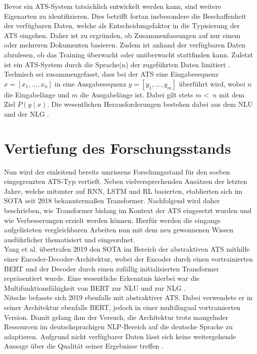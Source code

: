 \noindent
Bevor ein \ac{ATS}-System tatsächlich entwickelt werden kann, sind weitere Eigenarten zu identifizieren. Dies betrifft fortan insbesondere die Beschaffenheit der verfügbaren Daten, welche als Entscheidungsfaktor in die Typisierung der \ac{ATS} eingehen. Daher ist zu ergründen, ob Zusammenfassungen auf nur einem oder mehreren Dokumenten basieren. Zudem ist anhand der verfügbaren Daten abzulesen, ob das Training überwacht oder unüberwacht stattfinden kann. Zuletzt ist ein \ac{ATS}-System durch die Sprache(n) der zugeführten Daten limitiert \cite[S.~5]{GAM16}.\\

\noindent
Technisch sei zusammengefasst, dass bei der \ac{ATS} eine Eingabesequenz $x = [x_{1}, ..., x_{n}]$ in eine Ausgabesequenz $y = [y_{1}, ..., y_{m}]$ überführt wird, wobei $n$ die Eingabelänge und $m$ die Ausgabelänge ist. Dabei gilt stets $m$ \textless \, $n$ mit dem Ziel $P(y \mid x)$. Die wesentlichen Herausforderungen bestehen dabei aus dem \ac{NLU} und der \ac{NLG} \cite[S.~32-33]{NIT19}.


\section{Vertiefung des Forschungsstands}
\noindent
Nun wird der einleitend bereits umrissene Forschungsstand für den soeben eingegrenzten \ac{ATS}-Typ vertieft. Neben vielversprechenden Ansätzen der letzten Jahre, welche mitunter auf \ac{RNN}, \ac{LSTM} und \ac{RL} basierten, etablierten sich im \ac{SOTA} seit 2018 bekanntermaßen Transformer. Nachfolgend wird daher beschrieben, wie Transformer bislang im Kontext der \ac{ATS} eingesetzt wurden und wie Verbesserungen erzielt werden können. Hierfür werden die eingangs aufgelisteten vergleichbaren Arbeiten nun mit dem neu gewonnenen Wissen ausführlicher thematisiert und eingeordnet.\\

\noindent
Yang et al. übertrafen 2019 den \ac{SOTA} im Bereich der abstraktiven \ac{ATS} mithilfe einer Encoder-Decoder-Architektur, wobei der Encoder durch einen vortrainierten \ac{BERT} und der Decoder durch einen zufällig initialisierten Transformer repräsentiert wurde. Eine wesentliche Erkenntnis hierbei war die Multifunktionsfähigkeit von \ac{BERT} zur \ac{NLU} und zur \ac{NLG} \cite{YAN19}.\\

\noindent
Nitsche befasste sich 2019 ebenfalls mit abstraktiver \ac{ATS}. Dabei verwendete er in seiner Architektur ebenfalls \ac{BERT}, jedoch in einer multilingual vortrainierten Version. Damit gelang ihm der Versuch, die Architektur trotz mangelnder Ressourcen im deutschsprachigen \ac{NLP}-Bereich auf die deutsche Sprache zu adaptieren. Aufgrund nicht verfügbarer Daten lässt sich keine weitergehende Aussage über die Qualität seiner Ergebnisse treffen \cite{NIT19}.
\newpage

